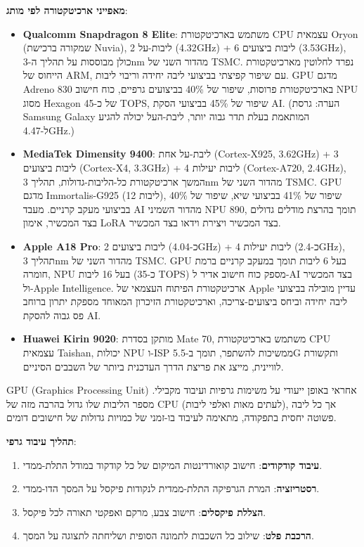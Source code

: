 \textbf{מאפייני ארכיטקטורה לפי מותג}:

\begin{itemize}
  \item \textbf{Qualcomm Snapdragon 8 Elite}: משתמש בארכיטקטורת CPU עצמאית Oryon (שמקורה ברכישת Nuvia), 2 ליבות-על (4.32GHz) + 6 ליבות ביצועים (3.53GHz), כולן מבוססות על תהליך ה-3nm מהדור השני של TSMC. נפרד לחלוטין מארכיטקטורת הייחוס של ARM, עם שיפור קפיצתי בביצועי ליבה יחידה וריבוי ליבות. GPU מדגם Adreno 830 בארכיטקטורת פרוסות, שיפור של 40\% בביצועים גרפיים, כוח חישוב NPU מסוג Hexagon של כ-45 TOPS, שיפור של 45\% בביצועי הסקת AI. (הערה: גרסת Samsung Galaxy המותאמת בעלת תדר גבוה יותר, ליבת-העל יכולה להגיע ל-4.47GHz.)
  \item \textbf{MediaTek Dimensity 9400}: ליבת-על אחת (Cortex-X925, 3.62GHz) + 3 ליבות ביצועים (Cortex-X4, 3.3GHz) + 4 ליבות יעילות (Cortex-A720, 2.4GHz), המשך ארכיטקטורת כל-הליבות-גדולות, תהליך 3nm מהדור השני של TSMC. GPU מדגם Immortalis-G925 (12 ליבות), שיפור של 41\% בביצועי שיא, שיפור של 40\% בביצועי מעקב קרניים. מעבד AI מהדור השמיני NPU 890, תומך בהרצת מודלים גדולים בצד המכשיר, אימון LoRA בצד המכשיר ויצירת וידאו בצד המכשיר.
  \item \textbf{Apple A18 Pro}: 2 ליבות ביצועים (כ-4.04GHz) + 4 ליבות יעילות (כ-2.4GHz), תהליך 3nm מהדור השני של TSMC. GPU בעל 6 ליבות תומך במעקב קרניים ברמת חומרה, NPU בעל 16 ליבות (כ-35 TOPS) מספק כוח חישוב אדיר ל-AI בצד המכשיר ול-Apple Intelligence. ארכיטקטורת הפיתוח העצמאי של Apple עדיין מובילה בביצועי ליבה יחידה וביחס ביצועים-צריכה, וארכיטקטורת הזיכרון המאוחד מספקת יתרון ברוחב פס גבוה להסקת AI.
  \item \textbf{Huawei Kirin 9020}: מותקן בסדרת Mate 70, משתמש בארכיטקטורת CPU עצמאית Taishan, יכולות NPU ו-ISP ממשיכות להשתפר, תומך ב-5.5G ותקשורת לוויינית, מייצג את פריצת הדרך העדכנית ביותר של השבבים הסיניים.
\end{itemize}


GPU (Graphics Processing Unit) אחראי באופן ייעודי על משימות גרפיות ועיבוד מקבילי. מספר הליבות שלו גדול בהרבה מזה של CPU (לעתים מאות ואלפי ליבות), אך כל ליבה פשוטה יחסית בתפקודה, מתאימה לעיבוד בו-זמני של כמויות גדולות של חישובים דומים.

\textbf{תהליך עיבוד גרפי}:

\begin{enumerate}
  \item \textbf{עיבוד קודקודים}: חישוב קואורדינטות המיקום של כל קודקוד במודל התלת-ממדי.
  \item \textbf{רסטריזציה}: המרת הגרפיקה התלת-ממדית לנקודות פיקסל על המסך הדו-ממדי.
  \item \textbf{הצללת פיקסלים}: חישוב צבע, מרקם ואפקטי תאורה לכל פיקסל.
  \item \textbf{הרכבת פלט}: שילוב כל השכבות לתמונה הסופית ושליחתה לתצוגה על המסך.
\end{enumerate}

